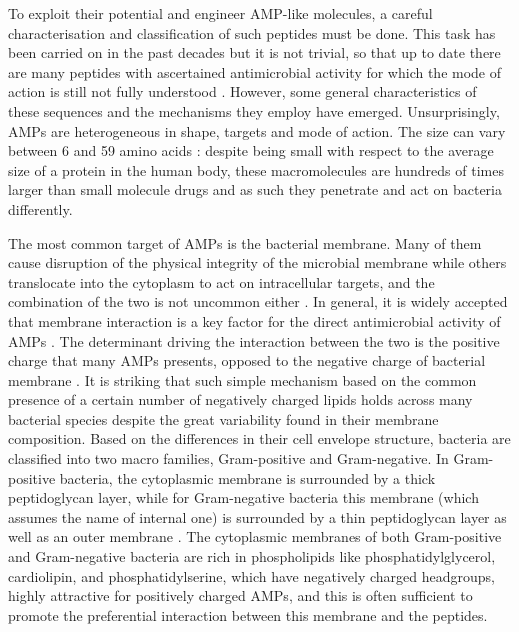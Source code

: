 To exploit their potential and engineer AMP-like molecules, a careful characterisation and classification of such peptides must be done. This task has been carried on in the past decades but it is not trivial, so that up to date there are many peptides with ascertained antimicrobial activity for which the mode of action is still not fully understood \cite{Ebbensgaard2015PLOS???}. However, some general characteristics of these sequences and the mechanisms they employ have emerged.
%
Unsurprisingly, AMPs are heterogeneous in shape, targets and mode of action. The size can vary between 6 and 59 amino acids \cite{Brogden2005}: despite being small with respect to the average size of a protein in the human body, these macromolecules are hundreds of times larger than small molecule drugs and as such they penetrate and act on bacteria differently.

The most common target of AMPs is the bacterial membrane. Many of them cause disruption of the physical integrity of the microbial membrane while others translocate into the cytoplasm to act on intracellular targets, and the combination of the two is not uncommon either \cite{Hancock2006}. In general, it is widely accepted that membrane interaction is a key factor for the direct antimicrobial activity of AMPs \cite{Nguyen2011,Malmsten2016}.
%
The determinant driving the interaction between the two is the positive charge that many AMPs presents, opposed to the negative charge of bacterial membrane \cite{Zhang2001,Schmitt2016}.
%
It is striking that such simple mechanism based on the common presence of a certain number of negatively charged lipids holds across many bacterial species despite the great variability found in their membrane composition.
%
Based on the differences in their cell envelope structure, bacteria are classified into two macro families, Gram-positive and Gram-negative. In Gram-positive bacteria, the cytoplasmic membrane is surrounded by a thick peptidoglycan layer, while for Gram-negative bacteria this membrane (which assumes the name of internal one) is surrounded by a thin peptidoglycan layer as well as an outer membrane \cite{Lin2016}.
%
The cytoplasmic membranes of both Gram-positive and Gram-negative bacteria are rich in phospholipids like phosphatidylglycerol, cardiolipin, and phosphatidylserine, which have negatively charged headgroups, highly attractive for positively charged AMPs, and this is often sufficient to promote the preferential interaction between this membrane and the peptides.

